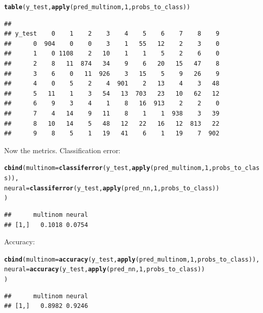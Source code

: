 \documentclass[a4paper]{article}
\makeatletter
\newcommand{\hlnum}[1]{\textcolor[rgb]{0.686,0.059,0.569}{#1}}%
\newcommand{\hlstd}[1]{\textcolor[rgb]{0.345,0.345,0.345}{#1}}%
\newcommand{\hlkwc}[1]{\textcolor[rgb]{0.333,0.667,0.333}{#1}}%
\newcommand{\hlkwd}[1]{\textcolor[rgb]{0.737,0.353,0.396}{\textbf{#1}}}%
\newenvironment{kframe}{%
 \def\at@end@of@kframe{}%
 \ifinner\ifhmode%
  \def\at@end@of@kframe{\end{minipage}}%
  \begin{minipage}{\columnwidth}%
 \fi\fi%
 \def\FrameCommand##1{\hskip\@totalleftmargin \hskip-\fboxsep
 \colorbox{shadecolor}{##1}\hskip-\fboxsep
     \hskip-\linewidth \hskip-\@totalleftmargin \hskip\columnwidth}%
 \MakeFramed {\advance\hsize-\width
   \@totalleftmargin\z@ \linewidth\hsize
   \@setminipage}}%
 {\par\unskip\endMakeFramed%
 \at@end@of@kframe}
\newenvironment{knitrout}{}{} %
\makeatother
\begin{document}
{\begin{enumerate}
\begin{knitrout}
\color{fgcolor}\begin{kframe}
\begin{alltt}
\hlkwd{table}\hlstd{(y_test,} \hlkwd{apply}\hlstd{(pred_multinom,}\hlnum{1}\hlstd{,probs_to_class))}
\end{alltt}
\begin{verbatim}
##       
## y_test    0    1    2    3    4    5    6    7    8    9
##      0  904    0    0    3    1   55   12    2    3    0
##      1    0 1108    2   10    1    1    5    2    6    0
##      2    8   11  874   34    9    6   20   15   47    8
##      3    6    0   11  926    3   15    5    9   26    9
##      4    0    5    2    4  901    2   13    4    3   48
##      5   11    1    3   54   13  703   23   10   62   12
##      6    9    3    4    1    8   16  913    2    2    0
##      7    4   14    9   11    8    1    1  938    3   39
##      8   10   14    5   48   12   22   16   12  813   22
##      9    8    5    1   19   41    6    1   19    7  902
\end{verbatim}
\end{kframe}
\end{knitrout}

Now the metrics. Classification error:

\begin{knitrout}
\color{fgcolor}\begin{kframe}
\begin{alltt}
\hlkwd{cbind}\hlstd{(}\hlkwc{multinom} \hlstd{=} \hlkwd{classiferror}\hlstd{(y_test,} \hlkwd{apply}\hlstd{(pred_multinom,}\hlnum{1}\hlstd{,probs_to_class)),}
      \hlkwc{neural} \hlstd{=} \hlkwd{classiferror}\hlstd{(y_test,} \hlkwd{apply}\hlstd{(pred_nn,}\hlnum{1}\hlstd{,probs_to_class))}
\hlstd{)}
\end{alltt}
\begin{verbatim}
##      multinom neural
## [1,]   0.1018 0.0754
\end{verbatim}
\end{kframe}
\end{knitrout}

Accuracy:

\begin{knitrout}
\color{fgcolor}\begin{kframe}
\begin{alltt}
\hlkwd{cbind}\hlstd{(}\hlkwc{multinom} \hlstd{=} \hlkwd{accuracy}\hlstd{(y_test,} \hlkwd{apply}\hlstd{(pred_multinom,}\hlnum{1}\hlstd{,probs_to_class)),}
      \hlkwc{neural} \hlstd{=} \hlkwd{accuracy}\hlstd{(y_test,} \hlkwd{apply}\hlstd{(pred_nn,}\hlnum{1}\hlstd{,probs_to_class))}
\hlstd{)}
\end{alltt}
\begin{verbatim}
##      multinom neural
## [1,]   0.8982 0.9246
\end{verbatim}
\end{kframe}
\end{knitrout}


\end{enumerate}}
\end{document}

